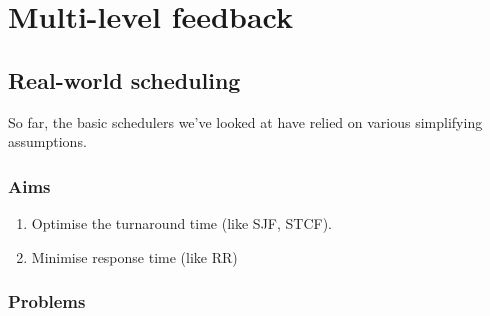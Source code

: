 \chapter{Multi-level feedback}
\label{ch:multi-level-feedback}



\section{Real-world scheduling}

So far, the basic schedulers we've looked at have relied on various simplifying assumptions.

\subsection{Aims}

\begin{enumerate}
\item Optimise the turnaround time (like SJF, STCF).
\item Minimise response time (like RR)
\end{enumerate}

\subsection{Problems}

